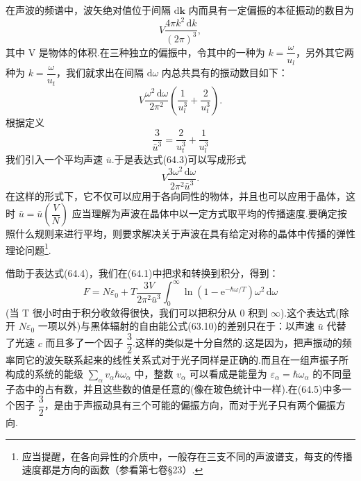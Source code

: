 在声波的频谱中，波矢绝对值位于间隔 $\mathrm{d}\boldsymbol{k}$ 内而具有一定偏振的本征振动的数目为
\begin{equation*}
  V\frac{4\pi k^2\,\mathrm{d}k}{(2\pi)^3},
\end{equation*}
其中 V 是物体的体积.在三种独立的偏振中，令其中的一种为 $k=\dfrac{\omega}{u_l}$，另外其它两种为 $k=\dfrac{\omega}{u_t}$，我们就求出在间隔 $\mathrm{d}\omega$ 内总共具有的振动数目如下：
\begin{equation}
  V\frac{\omega^2\,\mathrm{d}\omega}{2\pi^2}\left(\frac{1}{u_l^3}+\frac{2}{u_t^3}\right).
\end{equation}
根据定义
\begin{equation*}
  \frac{3}{\bar{u}^3}=\frac{2}{u_t^3}+\frac{1}{u_l^3}
\end{equation*}
我们引入一个平均声速 $\bar{u}$.于是表达式(64.3)可以写成形式
\begin{equation}
  V\frac{3\omega^2\,\mathrm{d}\omega}{2\pi^2\bar{u}^3}.
\end{equation}
在这样的形式下，它不仅可以应用于各向同性的物体，并且也可以应用于晶体，这时 $\bar{u}=\bar{u}\left(\dfrac{V}{N}\right)$ 应当理解为声波在晶体中以一定方式取平均的传播速度.要确定按照什么规则来进行平均，则要求解决关于声波在具有给定对称的晶体中传播的弹性理论问题\footnote{应当提醒，在各向异性的介质中，一般存在三支不同的声波谱支，每支的传播速度都是方向的函数（参看第七卷§23）.}.

借助于表达式(64.4)，我们在(64.1)中把求和转换到积分，得到：
\begin{equation}
  F=N\varepsilon_0+T\frac{3V}{2\pi^2\bar{u}^3}\int_0^{\infty}\ln\left(1-\mathrm{e}^{-\hbar\omega/T}\right)\omega^2\,\mathrm{d}\omega
\end{equation}
(当 T 很小时由于积分收敛得很快，我们可以把积分从 0 积到 $\infty$).这个表达式(除开 $N\varepsilon_0$ 一项以外)与黑体辐射的自由能公式(63.10)的差别只在于：以声速 $\bar{u}$ 代替了光速 $c$ 而且多了一个因子 $\dfrac{3}{2}$.这样的类似是十分自然的.这是因为，把声振动的频率同它的波矢联系起来的线性关系式对于光子同样是正确的.而且在一组声振子所构成的系统的能级 $\sum_\alpha v_\alpha\hbar\omega_\alpha$ 中，整数 $v_\alpha$ 可以看成是能量为 $\varepsilon_\alpha=\hbar\omega_\alpha$ 的不同量子态中的占有数，并且这些数的值是任意的(像在玻色统计中一样).在(64.5)中多一个因子 $\dfrac{3}{2}$，是由于声振动具有三个可能的偏振方向，而对于光子只有两个偏振方向.

